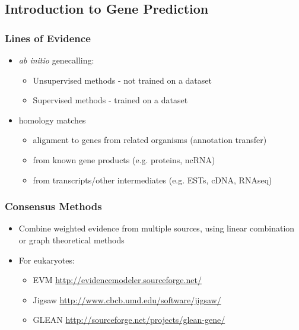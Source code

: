 %

\subsection{Introduction to Gene Prediction}
\begin{frame}
  \frametitle{Lines of Evidence}
  \begin{itemize}
    \item \textit{ab initio} genecalling: 
    \begin{itemize}
      \item Unsupervised methods - not trained on a dataset
      \item Supervised methods - trained on a dataset
    \end{itemize}
    \item homology matches
    \begin{itemize}
      \item alignment to genes from related organisms (annotation transfer)
      \item from known gene products (e.g. proteins, ncRNA)
      \item from transcripts/other intermediates (e.g. ESTs, cDNA, RNAseq)
    \end{itemize}
  \end{itemize}
\end{frame}

\begin{frame}
  \frametitle{Consensus Methods}
  \begin{itemize}
    \item Combine weighted evidence from multiple sources, using linear combination or graph theoretical methods
    \item For eukaryotes:
    \begin{itemize}
      \item EVM \url{http://evidencemodeler.sourceforge.net/}
      \item Jigsaw \url{http://www.cbcb.umd.edu/software/jigsaw/}
      \item GLEAN \url{http://sourceforge.net/projects/glean-gene/}
    \end{itemize}
  \end{itemize}
 \end{frame}
